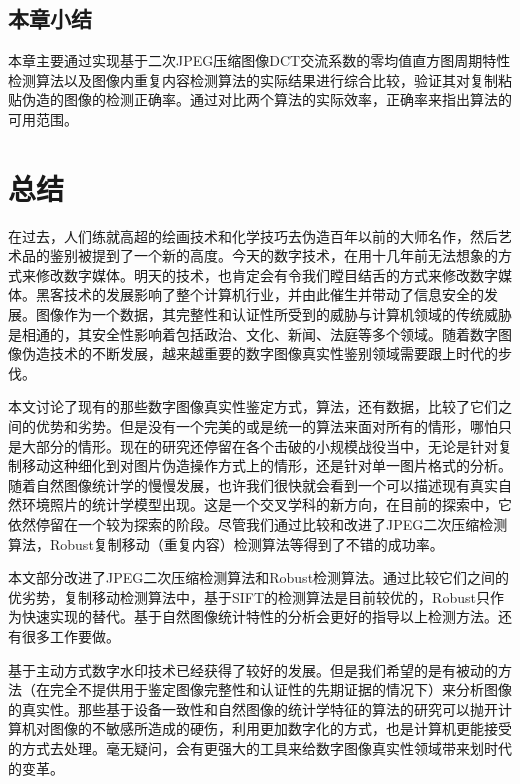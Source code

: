 \documentclass[a4paper, 10pt, notitlepage]{report}
\begin{document}
	\section{本章小结}
		本章主要通过实现基于二次JPEG压缩图像DCT交流系数的零均值直方图周期特性检测算法以及图像内重复内容检测算法的实际结果进行综合比较，验证其对复制粘贴伪造的图像的检测正确率。通过对比两个算法的实际效率，正确率来指出算法的可用范围。

\chapter{总结}
	在过去，人们练就高超的绘画技术和化学技巧去伪造百年以前的大师名作，然后艺术品的鉴别被提到了一个新的高度。今天的数字技术，在用十几年前无法想象的方式来修改数字媒体。明天的技术，也肯定会有令我们瞠目结舌的方式来修改数字媒体。黑客技术的发展影响了整个计算机行业，并由此催生并带动了信息安全的发展。图像作为一个数据，其完整性和认证性所受到的威胁与计算机领域的传统威胁是相通的，其安全性影响着包括政治、文化、新闻、法庭等多个领域。随着数字图像伪造技术的不断发展，越来越重要的数字图像真实性鉴别领域需要跟上时代的步伐。

	本文讨论了现有的那些数字图像真实性鉴定方式，算法，还有数据，比较了它们之间的优势和劣势。但是没有一个完美的或是统一的算法来面对所有的情形，哪怕只是大部分的情形。现在的研究还停留在各个击破的小规模战役当中，无论是针对复制移动这种细化到对图片伪造操作方式上的情形，还是针对单一图片格式的分析。随着自然图像统计学的慢慢发展，也许我们很快就会看到一个可以描述现有真实自然环境照片的统计学模型出现。这是一个交叉学科的新方向，在目前的探索中，它依然停留在一个较为探索的阶段。尽管我们通过比较和改进了JPEG二次压缩检测算法，Robust复制移动（重复内容）检测算法等得到了不错的成功率。

	本文部分改进了JPEG二次压缩检测算法和Robust检测算法。通过比较它们之间的优劣势，复制移动检测算法中，基于SIFT的检测算法是目前较优的，Robust只作为快速实现的替代。基于自然图像统计特性的分析会更好的指导以上检测方法。还有很多工作要做。

	基于主动方式数字水印技术已经获得了较好的发展。但是我们希望的是有被动的方法（在完全不提供用于鉴定图像完整性和认证性的先期证据的情况下）来分析图像的真实性。那些基于设备一致性和自然图像的统计学特征的算法的研究可以抛开计算机对图像的不敏感所造成的硬伤，利用更加数字化的方式，也是计算机更能接受的方式去处理。毫无疑问，会有更强大的工具来给数字图像真实性领域带来划时代的变革。




\nocite{*}
\end{document}
